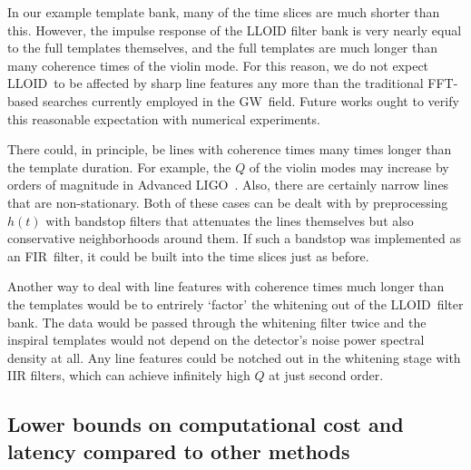\documentclass[preprint2]{aastex}
\newcommand{\GW}{GW}%
\newcommand{\LIGO}{LIGO}%
\newcommand{\fir}{FIR}%
\newcommand{\fft}{FFT}%
\newcommand{\lloid}{LLOID}%
\begin{document}
In our example template bank, many of the time slices are much shorter
than this.  However, the impulse response of the LLOID filter bank is very nearly
equal to the full templates themselves, and the full templates are much longer than many
coherence times of the violin mode.  For this reason, we do not expect
\lloid\ to be affected by sharp line features any more than the
traditional \fft-based searches currently employed in the \GW\ field.  Future works ought to verify this reasonable expectation with numerical experiments.

There could, in principle, be lines with coherence times many times
longer than the template duration.  For example, the $Q$ of the violin
modes may increase by orders of magnitude in Advanced \LIGO~\citep{ALIGOSusp}.  Also,
there are certainly narrow lines that are non-stationary.  Both of these
cases can be dealt with by preprocessing $h(t)$ with bandstop filters
that attenuates the lines themselves but also conservative neighborhoods
around them.  If such a bandstop was implemented as an \fir\ filter, it
could be built into the time slices just as before.

Another way to deal with line features with coherence times much longer than the templates would be to entrirely `factor' the whitening out of the \lloid\ filter bank.  The data would be passed through the whitening filter twice and the inspiral templates would not depend on the detector's noise power spectral density at all.  Any line features could be notched out in the whitening stage with IIR filters, which can achieve infinitely high $Q$ at just second order.

\subsection{Lower bounds on computational cost and latency compared to other
methods}
\end{document}
